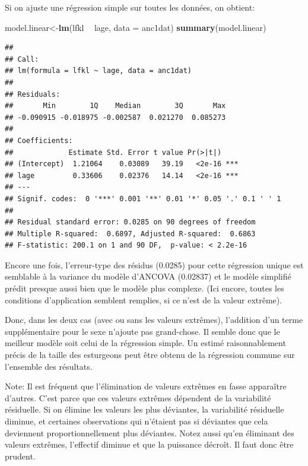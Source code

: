 \documentclass[12pt,]{book}
\newenvironment{Shaded}{\begin{snugshade}}{\end{snugshade}}
\newcommand{\DataTypeTok}[1]{\textcolor[rgb]{0.13,0.29,0.53}{#1}}
\newcommand{\KeywordTok}[1]{\textcolor[rgb]{0.13,0.29,0.53}{\textbf{#1}}}
\newcommand{\NormalTok}[1]{#1}
\newcommand{\OperatorTok}[1]{\textcolor[rgb]{0.81,0.36,0.00}{\textbf{#1}}}
\newcommand{\StringTok}[1]{\textcolor[rgb]{0.31,0.60,0.02}{#1}}
\begin{document}
Si on ajuste une régression simple sur toutes les données, on obtient:

\begin{Shaded}
\begin{Highlighting}[]
\NormalTok{model.linear<-}\KeywordTok{lm}\NormalTok{(lfkl }\OperatorTok{~}\StringTok{ }\NormalTok{lage, }\DataTypeTok{data =}\NormalTok{ anc1dat)}
\KeywordTok{summary}\NormalTok{(model.linear)}
\end{Highlighting}
\end{Shaded}

\begin{verbatim}
## 
## Call:
## lm(formula = lfkl ~ lage, data = anc1dat)
## 
## Residuals:
##       Min        1Q    Median        3Q       Max 
## -0.090915 -0.018975 -0.002587  0.021270  0.085273 
## 
## Coefficients:
##             Estimate Std. Error t value Pr(>|t|)    
## (Intercept)  1.21064    0.03089   39.19   <2e-16 ***
## lage         0.33606    0.02376   14.14   <2e-16 ***
## ---
## Signif. codes:  0 '***' 0.001 '**' 0.01 '*' 0.05 '.' 0.1 ' ' 1
## 
## Residual standard error: 0.0285 on 90 degrees of freedom
## Multiple R-squared:  0.6897, Adjusted R-squared:  0.6863 
## F-statistic: 200.1 on 1 and 90 DF,  p-value: < 2.2e-16
\end{verbatim}

Encore une fois, l'erreur-type des résidus (0.0285) pour cette régression unique est semblable à la variance du modèle d'ANCOVA (0.02837) et le modèle simplifié prédit presque aussi bien que le modèle plus complexe. (Ici encore, toutes les conditions d'application semblent remplies, si ce n'est de la valeur extrême).

Donc, dans les deux cas (avec ou sans les valeurs extrêmes), l'addition d'un terme supplémentaire pour le sexe n'ajoute pas grand-chose. Il semble donc que le meilleur modèle soit celui de la régression simple. Un estimé raisonnablement précis de la taille des esturgeons peut être obtenu de la régression commune sur l'ensemble des résultats.

Note: Il est fréquent que l'élimination de valeurs extrêmes en fasse apparaître d'autres. C'est parce que ces valeurs extrêmes dépendent de la variabilité résiduelle. Si on élimine les valeurs les plus déviantes, la variabilité résiduelle diminue, et certaines observations qui n'étaient pas si déviantes que cela deviennent proportionnellement plus déviantes. Notez aussi qu'en éliminant des valeurs extrêmes, l'effectif diminue et que la puissance décroît. Il faut donc être prudent.
\end{document}
